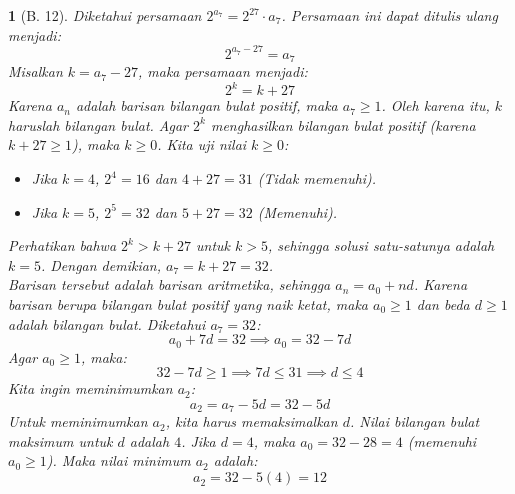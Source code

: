 \documentclass[11pt,a4paper,DIV=12]{scrartcl}
\theoremstyle{problemstyle}
\theoremstyle{answerstyle}
\newtheorem{answer}{}
\begin{document}
\begin{answer}[B. 12]
  Diketahui persamaan $2^{a_7} = 2^{27} \cdot a_7$.
  Persamaan ini dapat ditulis ulang menjadi:
  $$ 2^{a_7 - 27} = a_7 $$
  Misalkan $k = a_7 - 27$, maka persamaan menjadi:
  $$ 2^k = k + 27 $$
  Karena $a_n$ adalah barisan bilangan bulat positif, maka $a_7 \ge 1$. Oleh karena itu, $k$ haruslah bilangan bulat. Agar $2^k$ menghasilkan bilangan bulat positif (karena $k+27 \ge 1$), maka $k \ge 0$.
  Kita uji nilai $k \ge 0$:
  \begin{itemize}
    \item Jika $k = 4$, $2^4 = 16$ dan $4 + 27 = 31$ (Tidak memenuhi).
    \item Jika $k = 5$, $2^5 = 32$ dan $5 + 27 = 32$ (Memenuhi).
  \end{itemize}
  Perhatikan bahwa $2^k>k+27$ untuk $k > 5$, sehingga solusi satu-satunya adalah $k=5$. Dengan demikian, $a_7 = k + 27 = 32$.\\
  Barisan tersebut adalah barisan aritmetika, sehingga $a_n = a_0 + nd$. Karena barisan berupa bilangan bulat positif yang naik ketat, maka $a_0 \ge 1$ dan beda $d \ge 1$ adalah bilangan bulat.
  Diketahui $a_7 = 32$:
  $$ a_0 + 7d = 32 \implies a_0 = 32 - 7d $$
  Agar $a_0 \ge 1$, maka:
  $$ 32 - 7d \ge 1 \implies 7d \le 31 \implies d \le 4 $$
  Kita ingin meminimumkan $a_2$:
  $$ a_2 = a_7 - 5d = 32 - 5d $$
  Untuk meminimumkan $a_2$, kita harus memaksimalkan $d$. Nilai bilangan bulat maksimum untuk $d$ adalah $4$.
  Jika $d = 4$, maka $a_0 = 32 - 28 = 4$ (memenuhi $a_0 \ge 1$).
  Maka nilai minimum $a_2$ adalah:
  $$ a_2 = 32 - 5(4) = \boxed{12} $$
\end{answer}
\end{document}
